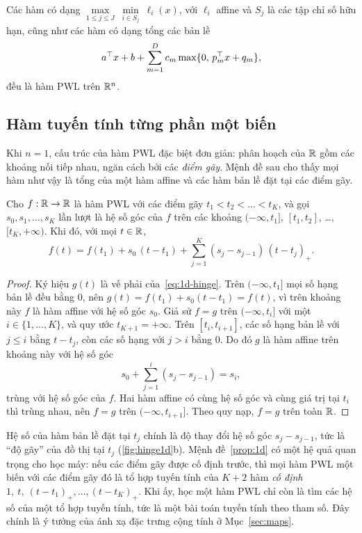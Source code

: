 \begin{corollary}\label{cor:forms}
Các hàm có dạng $\max\limits_{1\le j\le J}\ \min\limits_{i\in S_j}\ \ell_i(x)$, với $\ell_i$ affine và $S_j$ là các tập chỉ số hữu hạn, cũng như các hàm có dạng tổng các bản lề
\[
a^\top x+b+\sum_{m=1}^{D} c_m\max\{0,\,p_m^\top x+q_m\},
\]
đều là hàm PWL trên $\mathbb{R}^n$.
\end{corollary}

\subsection{Hàm tuyến tính từng phần một biến}

Khi $n=1$, cấu trúc của hàm PWL đặc biệt đơn giản: phân hoạch của $\mathbb{R}$ gồm các khoảng nối tiếp nhau, ngăn cách bởi các \emph{điểm gãy}. Mệnh đề sau cho thấy mọi hàm như vậy là tổng của một hàm affine và các hàm bản lề đặt tại các điểm gãy.

\begin{proposition}\label{prop:1d}
Cho $f:\mathbb{R}\to\mathbb{R}$ là hàm PWL với các điểm gãy $t_1<t_2<\dots<t_K$, và gọi $s_0,s_1,\dots,s_K$ lần lượt là hệ số góc của $f$ trên các khoảng $(-\infty,t_1]$, $[t_1,t_2]$, \dots, $[t_K,+\infty)$. Khi đó, với mọi $t\in\mathbb{R}$,
\begin{equation}\label{eq:1d-hinge}
f(t)=f(t_1)+s_0\,(t-t_1)+\sum_{j=1}^{K}(s_j-s_{j-1})\,(t-t_j)_+ .
\end{equation}
\end{proposition}

\begin{proof}
Ký hiệu $g(t)$ là vế phải của~\eqref{eq:1d-hinge}. Trên $(-\infty,t_1]$ mọi số hạng bản lề đều bằng $0$, nên $g(t)=f(t_1)+s_0(t-t_1)=f(t)$, vì trên khoảng này $f$ là hàm affine với hệ số góc $s_0$. Giả sử $f=g$ trên $(-\infty,t_i]$ với một $i\in\{1,\dots,K\}$, và quy ước $t_{K+1}=+\infty$. Trên $[t_i,t_{i+1}]$, các số hạng bản lề với $j\le i$ bằng $t-t_j$, còn các số hạng với $j>i$ bằng $0$. Do đó $g$ là hàm affine trên khoảng này với hệ số góc
\[
s_0+\sum_{j=1}^{i}(s_j-s_{j-1})=s_i ,
\]
trùng với hệ số góc của $f$. Hai hàm affine có cùng hệ số góc và cùng giá trị tại $t_i$ thì trùng nhau, nên $f=g$ trên $(-\infty,t_{i+1}]$. Theo quy nạp, $f=g$ trên toàn $\mathbb{R}$.
\end{proof}

\begin{remark}\label{rem:1d}
Hệ số của hàm bản lề đặt tại $t_j$ chính là độ thay đổi hệ số góc $s_j-s_{j-1}$, tức là “độ gãy” của đồ thị tại $t_j$ (\cref{fig:hinge1d}b). Mệnh đề~\ref{prop:1d} có một hệ quả quan trọng cho học máy: nếu các điểm gãy được cố định trước, thì mọi hàm PWL một biến với các điểm gãy đó là tổ hợp tuyến tính của $K+2$ hàm \emph{cố định} $1,\ t,\ (t-t_1)_+,\dots,(t-t_K)_+$. Khi ấy, học một hàm PWL chỉ còn là tìm các hệ số của một tổ hợp tuyến tính, tức là một bài toán tuyến tính theo tham số. Đây chính là ý tưởng của ánh xạ đặc trưng cộng tính ở Mục~\ref{sec:maps}.
\end{remark}

